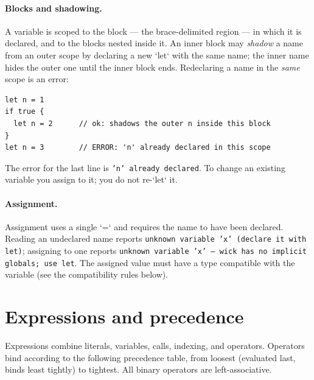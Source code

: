 \paragraph{Blocks and shadowing.} A variable is scoped to the block --- the
brace-delimited region --- in which it is declared, and to the blocks nested
inside it. An inner block may \emph{shadow} a name from an outer scope by
declaring a new `let` with the same name; the inner name hides the outer one
until the inner block ends. Redeclaring a name in the \emph{same} scope is an
error:

\begin{lstlisting}[language=wick]
let n = 1
if true {
  let n = 2      // ok: shadows the outer n inside this block
}
let n = 3        // ERROR: 'n' already declared in this scope
\end{lstlisting}

\noindent
The error for the last line is \texttt{'n' already declared}. To change an
existing variable you assign to it; you do not re-`let` it.

\paragraph{Assignment.} Assignment uses a single `=` and requires the name to
have been declared. Reading an undeclared name reports
\texttt{unknown variable 'x' (declare it with let)}; assigning to one reports
\texttt{unknown variable 'x' --- wick has no implicit globals; use let}. The
assigned value must have a type compatible with the variable (see the
compatibility rules below).

\section{Expressions and precedence}

Expressions combine literals, variables, calls, indexing, and operators.
Operators bind according to the following precedence table, from loosest
(evaluated last, binds least tightly) to tightest. All binary operators are
left-associative.

